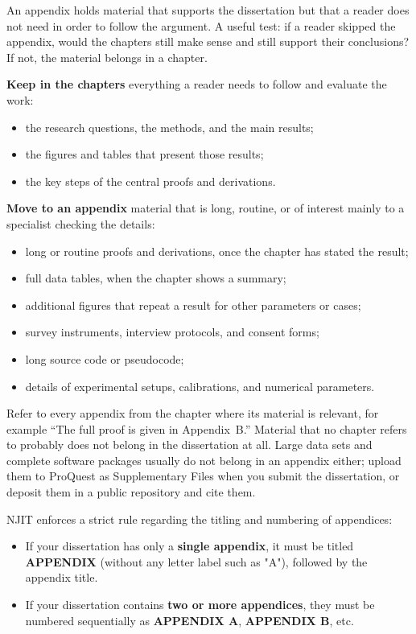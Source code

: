 
An appendix holds material that supports the dissertation but that a reader does not need in order to follow the argument. A useful test: if a reader skipped the appendix, would the chapters still make sense and still support their conclusions? If not, the material belongs in a chapter.

\textbf{Keep in the chapters} everything a reader needs to follow and evaluate the work:
\begin{itemize}
\item the research questions, the methods, and the main results;
\item the figures and tables that present those results;
\item the key steps of the central proofs and derivations.
\end{itemize}

\textbf{Move to an appendix} material that is long, routine, or of interest mainly to a specialist checking the details:
\begin{itemize}
\item long or routine proofs and derivations, once the chapter has stated the result;
\item full data tables, when the chapter shows a summary;
\item additional figures that repeat a result for other parameters or cases;
\item survey instruments, interview protocols, and consent forms;
\item long source code or pseudocode;
\item details of experimental setups, calibrations, and numerical parameters.
\end{itemize}

Refer to every appendix from the chapter where its material is relevant, for example ``The full proof is given in Appendix~B.'' Material that no chapter refers to probably does not belong in the dissertation at all. Large data sets and complete software packages usually do not belong in an appendix either; upload them to ProQuest as Supplementary Files when you submit the dissertation, or deposit them in a public repository and cite them.

NJIT enforces a strict rule regarding the titling and numbering of appendices:
\begin{itemize}
\item If your dissertation has only a \textbf{single appendix}, it must be titled \textbf{APPENDIX} (without any letter label such as "A"), followed by the appendix title.
\item If your dissertation contains \textbf{two or more appendices}, they must be numbered sequentially as \textbf{APPENDIX A}, \textbf{APPENDIX B}, etc.
\end{itemize}

